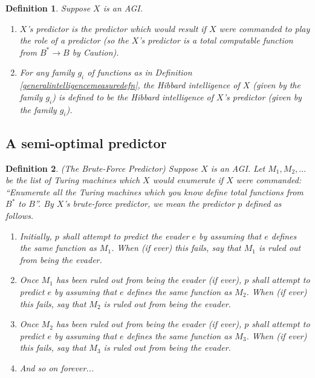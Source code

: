 \documentclass{article}
\newtheorem{definition}{Definition}
\begin{document}
\begin{definition}
\label{Xspredictordefn}
    Suppose $X$ is an AGI.
    \begin{enumerate}
        \item
        \emph{$X$'s predictor} is the predictor which
        would result if $X$ were commanded to play the role of a predictor (so
        the $X$'s predictor is a total computable function from $B^*\to B$ by Caution).
        \item
        For any family $g_i$ of functions as in
        Definition \ref{generalintelligencemeasuredefn},
        the \emph{Hibbard intelligence of $X$ (given by the family $g_i$)}
        is defined to be the Hibbard intelligence of
        $X$'s predictor (given by the family $g_i$).
    \end{enumerate}
\end{definition}

\subsection{A semi-optimal predictor}

\begin{definition}
\label{bruteforcepredictordefn}
    (The Brute-Force Predictor)
    Suppose $X$ is an AGI. Let $M_1,M_2,\ldots$ be the list of Turing machines
    which $X$ would enumerate if $X$ were commanded: ``Enumerate all the Turing
    machines which you know define total functions from $B^*$ to $B$''.
    By \emph{$X$'s brute-force predictor}, we mean the predictor $p$ defined
    as follows.
    \begin{enumerate}
        \item
        Initially, $p$ shall attempt to predict the evader $e$ by assuming that $e$
        defines the same function as $M_1$. When (if ever) this fails,
        say that \emph{$M_1$ is ruled out from being the evader}.
        \item
        Once $M_1$ has been ruled out from being the evader (if ever),
        $p$ shall attempt to predict $e$ by assuming that $e$ defines the same
        function as $M_2$. When (if ever) this fails,
        say that \emph{$M_2$ is ruled out from being the evader}.
        \item
        Once $M_2$ has been ruled out from being the evader (if ever),
        $p$ shall attempt to predict $e$ by assuming that $e$ defines the same
        function as $M_3$. When (if ever) this fails,
        say that \emph{$M_3$ is ruled out from being the evader}.
        \item
        And so on forever...
    \end{enumerate}
\end{definition}
\end{document}
